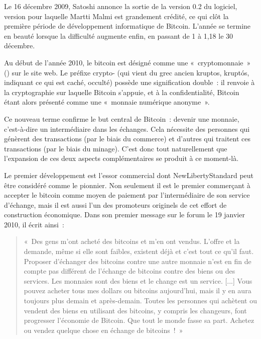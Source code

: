 Le 16 décembre 2009, Satoshi annonce la sortie de la version 0.2 du logiciel, version pour laquelle Martti Malmi est grandement crédité, ce qui clôt la première période de développement informatique de Bitcoin. L'année se termine en beauté lorsque la difficulté augmente enfin, en passant de 1 à 1,18 le 30 décembre.

Au début de l'année 2010, le bitcoin est désigné comme une «~cryptomonnaie~» () sur le site web. Le préfixe crypto- (qui vient du grec ancien \foreignlanguage{greek}{kruptos}, kruptós, indiquant ce qui est caché, occulté) possède une signification double~: il renvoie à la cryptographie sur laquelle Bitcoin s'appuie, et à la confidentialité, Bitcoin étant alors présenté comme une «~monnaie numérique anonyme~».

Ce nouveau terme confirme le but central de Bitcoin~: devenir une monnaie, c'est-à-dire un intermédiaire dans les échanges. Cela nécessite des personnes qui génèrent des transactions (par le biais du commerce) et d'autres qui traitent ces transactions (par le biais du minage). C'est donc tout naturellement que l'expansion de ces deux aspects complémentaires se produit à ce moment-là.



Le premier développement est l'essor commercial dont NewLibertyStandard peut être considéré comme le pionnier. Non seulement il est le premier commerçant à accepter le bitcoin comme moyen de paiement par l'intermédiaire de son service d'échange, mais il est aussi l'un des promoteurs originels de cet effort de construction économique. Dans son premier message sur le forum le 19 janvier 2010, il écrit ainsi~:

\begin{quote}
«~Des gens m'ont acheté des bitcoins et m'en ont vendus. L'offre et la demande, même si elle sont faibles, existent déjà et c'est tout ce qu'il faut. Proposer d'échanger des bitcoins contre une autre monnaie n'est en fin de compte pas différent de l'échange de bitcoins contre des biens ou des services. Les monnaies sont des biens et le change est un service. [...] Vous pouvez acheter tous mes dollars ou bitcoins aujourd'hui, mais il y en aura toujours plus demain et après-demain. Toutes les personnes qui achètent ou vendent des biens en utilisant des bitcoins, y compris les changeurs, font progresser l'économie de Bitcoin. Que tout le monde fasse sa part. Achetez ou vendez quelque chose en échange de bitcoins~!~»
\end{quote}

